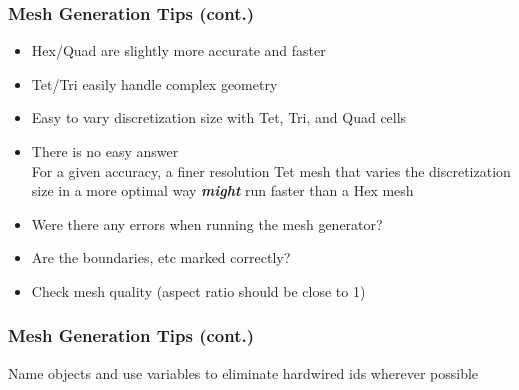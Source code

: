 \documentclass[aspectratio=169]{beamer}
\begin{document}
\begin{frame}
  \frametitle{Mesh Generation Tips (cont.)}
 
  \begin{itemize}
    \begin{itemize}
    \item Hex/Quad are slightly more accurate and faster
    \item Tet/Tri easily handle complex geometry
    \item Easy to vary discretization size with Tet, Tri, and Quad cells
    \item There is no easy answer\\
      For a given accuracy, a finer resolution Tet mesh that varies
      the discretization size in a more optimal way {\bf\it might} run
      faster than a Hex mesh
    \end{itemize}\pause
    \begin{itemize}
    \item Were there any errors when running the mesh generator?
    \item Are the boundaries, etc marked correctly?
    \item Check mesh quality (aspect ratio should be close to 1)
    \end{itemize}
  \end{itemize}

\end{frame}


\begin{frame}
  \frametitle{Mesh Generation Tips  (cont.)}
  \summary{}

  \begin{description}
     {Name objects and use
      variables to eliminate hardwired ids wherever possible}\pause
    \pause
    \pause
    \pause
    \pause
  \end{description}

\end{frame}
\end{document}
